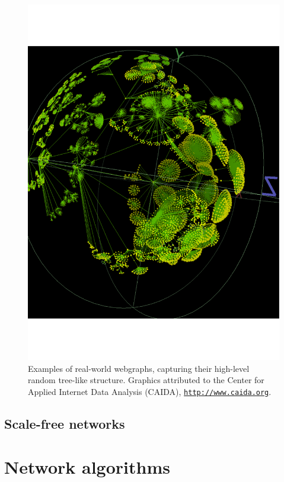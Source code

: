 \documentclass[aps, rmp, twocolumn, amsmath, amssymb, nofootinbib, superscriptaddress, longbibliography, floatfix, table-of-contents, eqsecnum]{revtex4-1}
\newcommand{\comment}[1]{{\color{blue}{\textbf{#1}}}}
\begin{document}
\begin{figure}[!htb]
\includegraphics[width=\columnwidth]{webgraph_2}
\caption{Examples of real-world webgraphs, capturing their high-level random tree-like structure. Graphics attributed to the Center for Applied Internet Data Analysis (CAIDA), \texttt{\href{http://www.caida.org}{http://www.caida.org}}.} \label{fig:webgraph}
\end{figure}

%
%

\subsection{Scale-free networks}

\comment{To do}

%
%

\section{Network algorithms} \label{sec:graph_theory} 
\end{document}
